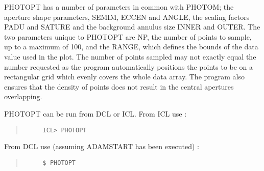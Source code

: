 PHOTOPT has a number of parameters in common with PHOTOM; the aperture
shape parameters, SEMIM, ECCEN and ANGLE, the scaling factors PADU and
SATURE and the background annulus size INNER and OUTER. The two
parameters unique to PHOTOPT are NP, the number of points to sample, up
to a maximum of 100, and the RANGE, which defines the bounds of the
data value used in the plot. The number of points sampled may not exactly
equal the number requested as the program automatically positions the
points to be on a rectangular grid which evenly covers the whole data array.
The program also ensures that the density of points does not result in
the central apertures overlapping.

PHOTOPT can be run from DCL or ICL. From ICL use :
\begin{quote}
\begin{verbatim}
     ICL> PHOTOPT
\end{verbatim}
\end{quote}
From DCL use (assuming ADAMSTART has been executed) :
\begin{quote}
\begin{verbatim}
     $ PHOTOPT
\end{verbatim}
\end{quote}


